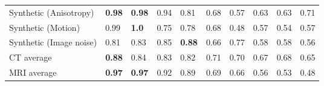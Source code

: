\begin{landscape}
\begin{table}[p]
\begin{tabular}{llllllllll}
			Synthetic (Anisotropy)    &  \textbf{0.98}  &  \textbf{0.98}  &            0.94 &            0.81 &  0.68 &       0.57 &  0.63 &     0.63 &  0.71 \\
			Synthetic (Motion)        &           0.99 &  \textbf{1.0}  &            0.75 &            0.78 &  0.68 &       0.48 &  0.57 &     0.54 &  0.57 \\
			Synthetic (Image noise)   &            0.81 &            0.83 &            0.85 &  \textbf{0.88}  &  0.66 &       0.77 &  0.58 &     0.58 &  0.56 \\
			\midrule
			CT average                &  \textbf{0.88}  &            0.84 &            0.83 &            0.82 &  0.71 &       0.70 &  0.67 &     0.68 &  0.65 \\
			MRI average               &  \textbf{0.97}  &  \textbf{0.97}  &            0.92 &            0.89 &  0.69 &       0.66 &  0.56 &     0.53 &  0.48 \\
			\bottomrule
		\end{tabular}%
	\label{tab:res_auroc}
\end{table}
\end{landscape}
